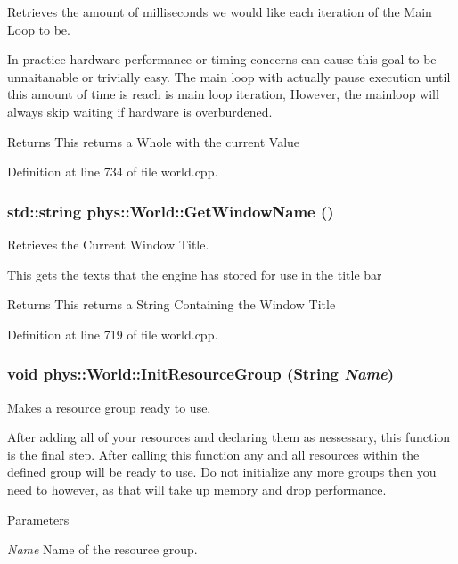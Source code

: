 Retrieves the amount of milliseconds we would like each iteration of the Main Loop to be. 

In practice hardware performance or timing concerns can cause this goal to be unnaitanable or trivially easy. The main loop with actually pause execution until this amount of time is reach is main loop iteration, However, the mainloop will always skip waiting if hardware is overburdened. \begin{DoxyReturn}{Returns}
This returns a Whole with the current Value 
\end{DoxyReturn}


Definition at line 734 of file world.cpp.

\hypertarget{classphys_1_1World_a1f0139bbc9561bcf18844be25e4adc73}{
\subsubsection[{GetWindowName}]{\setlength{\rightskip}{0pt plus 5cm}std::string phys::World::GetWindowName ()}}
\label{da/ddf/classphys_1_1World_a1f0139bbc9561bcf18844be25e4adc73}


Retrieves the Current Window Title. 

This gets the texts that the engine has stored for use in the title bar \begin{DoxyReturn}{Returns}
This returns a String Containing the Window Title 
\end{DoxyReturn}


Definition at line 719 of file world.cpp.

\hypertarget{classphys_1_1World_a82b1b40f39c1f2e48759fdb77389153d}{
\subsubsection[{InitResourceGroup}]{\setlength{\rightskip}{0pt plus 5cm}void phys::World::InitResourceGroup ({\bf String} {\em Name})}}
\label{da/ddf/classphys_1_1World_a82b1b40f39c1f2e48759fdb77389153d}


Makes a resource group ready to use. 

After adding all of your resources and declaring them as nessessary, this function is the final step. After calling this function any and all resources within the defined group will be ready to use. Do not initialize any more groups then you need to however, as that will take up memory and drop performance. 
\begin{DoxyParams}{Parameters}
\item[{\em Name}]Name of the resource group. \end{DoxyParams}


